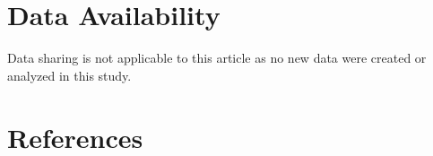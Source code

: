 \documentclass[%
 aip,
 floatfix,
 amsmath,amssymb,
 reprint,%
]{revtex4-1}
\begin{document}
\section*{Data Availability}
Data sharing is not applicable to this article as no new data were created or analyzed in this study.

\section*{References}



\end{document}
